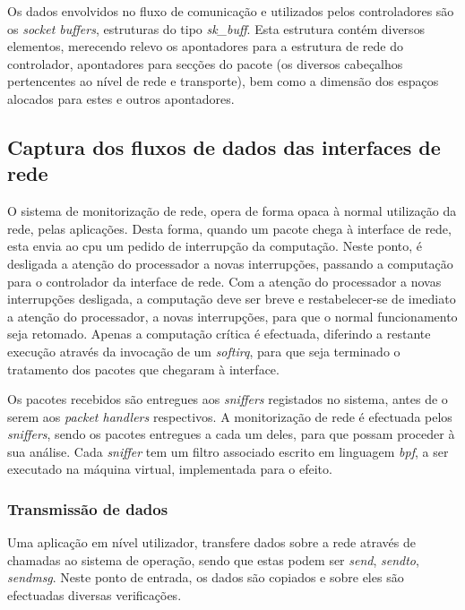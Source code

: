 Os dados envolvidos no fluxo de comunicação e utilizados pelos controladores são os \textit{socket buffers}, estruturas do tipo \textit{sk\_buff}.
Esta estrutura contém diversos elementos, merecendo relevo os apontadores para a estrutura de rede do controlador, apontadores para secções do pacote (os diversos cabeçalhos pertencentes ao nível de rede e transporte), bem como a dimensão dos espaços alocados para estes e outros apontadores.

\subsection{Captura dos fluxos de dados das interfaces de rede}

O sistema de monitorização de rede, opera de forma opaca à normal utilização da rede, pelas aplicações.
Desta forma, quando um pacote chega à interface de rede, esta envia ao cpu um pedido de interrupção da computação.
Neste ponto, é desligada a atenção do processador a novas interrupções, passando a computação para o controlador da interface de rede.
Com a atenção do processador a novas interrupções desligada, a computação deve ser breve e restabelecer-se de imediato a atenção do processador, a novas interrupções, para que o normal funcionamento seja retomado.
Apenas a computação crítica é efectuada, diferindo a restante execução através da invocação de um \textit{softirq}, para que seja terminado o tratamento dos pacotes que chegaram à interface.

Os pacotes recebidos são entregues aos \textit{sniffers} registados no sistema, antes de o serem aos \textit{packet handlers} respectivos.
A monitorização de rede é efectuada pelos \textit{sniffers}, sendo os pacotes entregues a cada um deles, para que possam proceder à sua análise.
Cada \textit{sniffer} tem um filtro associado escrito em linguagem \textit{bpf}, a ser executado na máquina virtual, implementada para o efeito.

\subsubsection{Transmissão de dados}

Uma aplicação em nível utilizador, transfere dados sobre a rede através de chamadas ao sistema de operação, sendo que estas podem ser \textit{send}, \textit{sendto}, \textit{sendmsg}.
Neste ponto de entrada, os dados são copiados e sobre eles são efectuadas diversas verificações.

